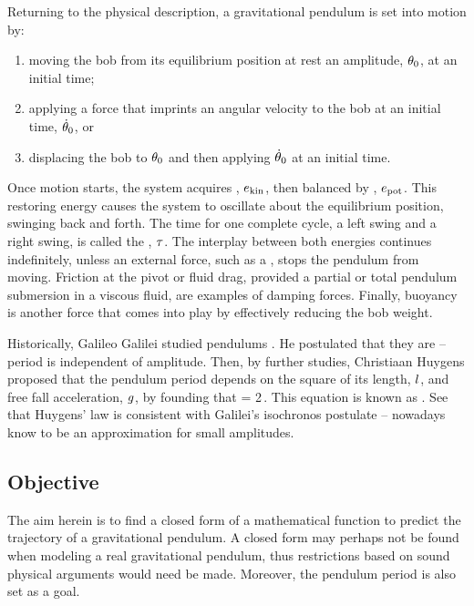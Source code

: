 Returning to the physical description, a gravitational pendulum is set into motion by:
\begin{enumerate}
\item moving the bob from its equilibrium position at rest an amplitude, $\theta_0$, at an initial time;
\item applying a force that imprints an angular velocity to the bob at an initial time, $\dot{\theta}_0$, or
\item displacing the bob to $\theta_0$ and then applying $\dot{\theta}_0$ at an initial time.
\end{enumerate}

Once motion starts, the system acquires , $e_\text{kin}$, then balanced by , $e_\text{pot}$. This restoring energy causes the system to oscillate about the equilibrium position, swinging back and forth. The time for one complete cycle, a left swing and a right swing, is called the , $\tau$. The interplay between both energies continues indefinitely, unless an external force, such as a , stops the pendulum from moving. Friction at the pivot or fluid drag, provided a partial or total pendulum submersion in a viscous fluid, are examples of damping forces. Finally, buoyancy is another force that comes into play by effectively reducing the bob weight.

Historically, Galileo Galilei studied pendulums . He postulated that they are  -- period is independent of amplitude. Then, by further studies, Christiaan Huygens proposed that the pendulum period depends on the square of its length, $l$, and free fall acceleration, $g$, by founding that
\beq
\oscper = 2\pi\sqrt{\dfrac{\length}{\grav}}\,.
\eeq
This equation is known as . See that Huygens' law is consistent with Galilei's isochronos postulate -- nowadays know to be an approximation for small amplitudes.


\subsection{Objective}
The aim herein is to find a closed form of a mathematical function to predict the trajectory of a gravitational pendulum. A closed form may perhaps not be found when modeling a real gravitational pendulum, thus restrictions based on sound physical arguments would need be made. Moreover, the pendulum period is also set as a goal.
